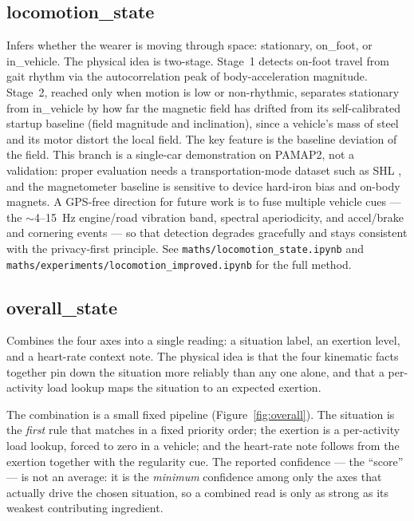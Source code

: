 \documentclass[11pt]{article}
\newcommand{\nb}[1]{\texttt{#1}}            %
\begin{document}
\subsection{locomotion\_state}
Infers whether the wearer is moving through space: stationary, on\_foot, or in\_vehicle.
The physical idea is two-stage. Stage~1 detects on-foot travel from gait rhythm via the
autocorrelation peak of body-acceleration magnitude. Stage~2, reached only when motion
is low or non-rhythmic, separates stationary from in\_vehicle by how far the magnetic
field has drifted from its self-calibrated startup baseline (field magnitude and
inclination), since a vehicle's mass of steel and its motor distort the local field. The
key feature is the baseline deviation of the field. This branch is a single-car
demonstration on PAMAP2, not a validation: proper evaluation needs a transportation-mode
dataset such as SHL \citep{gjoreski2018shl}, and the magnetometer baseline is sensitive
to device hard-iron bias and on-body magnets. A GPS-free direction for future work is to
fuse multiple vehicle cues --- the $\sim$4--15~Hz engine/road vibration band, spectral
aperiodicity, and accel/brake and cornering events \citep{hemminki2013transportation}
--- so that detection degrades gracefully and stays consistent with the privacy-first
principle.
See \nb{maths/locomotion\_state.ipynb} and \nb{maths/experiments/locomotion\_improved.ipynb}
for the full method.

\subsection{overall\_state}
Combines the four axes into a single reading: a situation label, an exertion level, and
a heart-rate context note. The physical idea is that the four kinematic facts together
pin down the situation more reliably than any one alone, and that a per-activity load
lookup maps the situation to an expected exertion.

The combination is a small fixed pipeline (Figure~\ref{fig:overall}). The situation is
the \emph{first} rule that matches in a fixed priority order; the exertion is a
per-activity load lookup, forced to zero in a vehicle; and the heart-rate note follows
from the exertion together with the regularity cue. The reported confidence --- the
``score'' --- is not an average: it is the \emph{minimum} confidence among only the axes
that actually drive the chosen situation, so a combined read is only as strong as its
weakest contributing ingredient.
\end{document}
